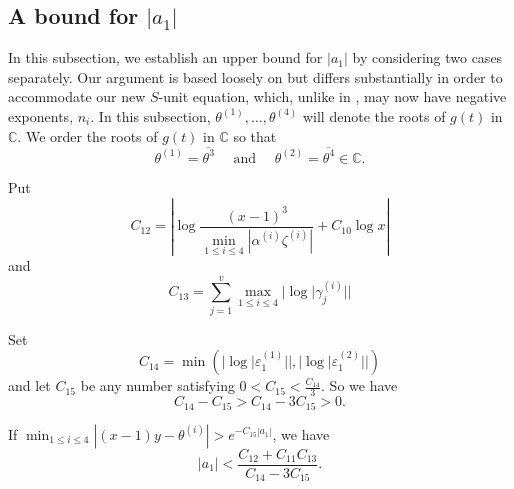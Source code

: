 {%

\subsection{A bound for $|a_1|$}

In this subsection, we establish an upper bound for $|a_1|$ by considering two cases separately. Our argument is based loosely on \cite{TW3} but differs substantially in order to accommodate our new $S$-unit equation, which, unlike in \cite{TW3}, may now have negative exponents, $n_i$. In this subsection, $\theta^{(1)}, \dots, \theta^{(4)}$ will denote the roots of $g(t)$ in $\mathbb{C}$. We order the roots of $g(t)$ in $\mathbb{C}$ so that
\[\theta^{(1)} = \overline{\theta^{3}} \quad \text{ and } \quad \theta^{(2)} = \overline{\theta^{4}} \in \mathbb{C}.\]



Put
\[C_{12} = \left|\log \frac{(x-1)^3}{\displaystyle \min_{1\leq i \leq 4} |\alpha^{(i)}\zeta^{(i)}|} + C_{10} \log{x}\right|\]
and 
\[C_{13} = \sum_{j = 1}^v \max_{1\leq i \leq 4} |\log|\gamma_j^{(i)}||\]


Set 
\[C_{14} = \min \left( |\log|\varepsilon_1^{(1)}||, |\log|\varepsilon_1^{(2)}||\right)\]
and let $C_{15}$ be any number satisfying $0 < C_{15} < \frac{C_{14}}{3}$.
So we have 
\[C_{14} - C_{15} > C_{14} - 3C_{15} > 0.\]

\begin{lemma}
If $\displaystyle \min_{1\leq i \leq 4}|(x-1)y-\theta^{(i)}| > e^{-C_{15}|a_1|}$, we have
\[|a_1|<  \frac{C_{12} + C_{11}C_{13}}{C_{14} - 3C_{15}} .\]
\end{lemma}

}
